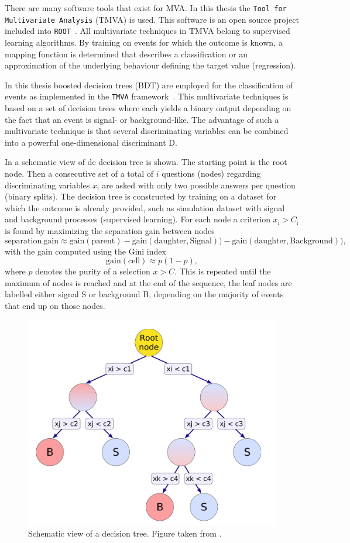 There are many software tools that exist for MVA. In this thesis the \texttt{Tool for Multivariate Analysis} (TMVA) \cite{2007physics3039H} is used. This software is an open source project included into \texttt{ROOT}~\cite{Brun:1997pa}. 
All multivariate techniques in TMVA belong to supervised learning algorithms. By training on events for which the outcome is known, a mapping function is determined that describes a classification or an approximation of the underlying behaviour defining the target value (regression). 


In this thesis boosted decision trees (BDT) are employed for the classification of events as implemented in the \texttt{TMVA} framework~\cite{2007physics3039H}. This multivariate techniques is based on a set of decision trees where each yields a binary output depending on the fact that an event is signal- or background-like. The advantage of such a multivariate technique is that several discriminating variables can be combined into a powerful one-dimensional discriminant D. 

In  a schematic view of de decision tree is shown. The starting point is the root node. Then a consecutive set of a total of $i$ questions (nodes) regarding discriminating variables $x_\mathrm{i}$ are asked with only two possible answers per question (binary splits). The decision tree is constructed by training on a dataset for which the outcome is already provided, such as simulation dataset with signal and background processes (supervised learning). For each node a criterion $x_{\mathrm{i}}>C_{\mathrm{i}}$ is found by maximizing the separation gain between nodes 
\begin{equation}
\mathrm{separation}\:\mathrm{gain} \approx \mathrm{gain(parent)} - \mathrm{gain (daughter,Signal))} - \mathrm{gain (daughter,Background))},
\end{equation}
with the gain computed using the Gini index
\begin{equation}
 \mathrm{gain(cell)} \approx p (1-p), 
\end{equation}
where $p$ denotes the purity of a selection $x>C$. This is repeated until the maximum of nodes is reached and at the end of the sequence, the leaf nodes are labelled either signal S or background B, depending on the majority of events that end up on those nodes. 
\begin{figure}[htbp]
	\centering
	\includegraphics[width=0.5\linewidth]{3_Analysis_techniques/Figures/BDT}
	\caption{Schematic view of a decision tree. Figure taken from \cite{2007physics3039H}.}
	\label{fig:BDTexample}
\end{figure}


